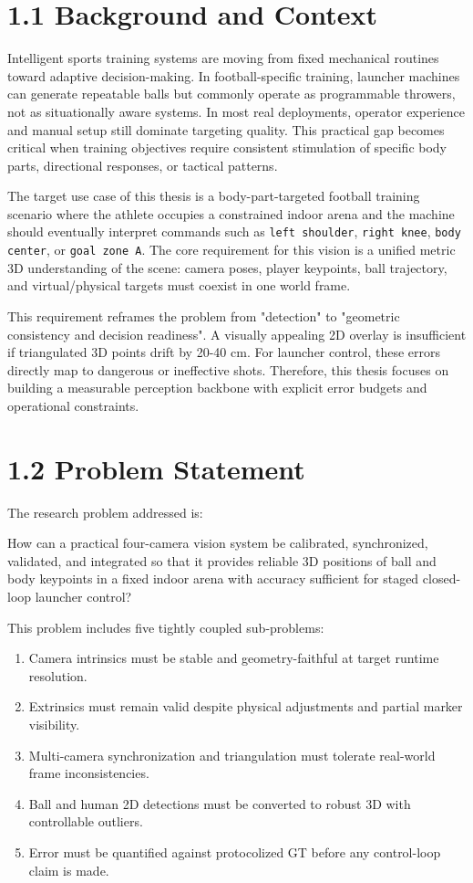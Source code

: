 \section{1.1 Background and Context}
Intelligent sports training systems are moving from fixed mechanical routines toward adaptive decision-making. In football-specific training, launcher machines can generate repeatable balls but commonly operate as programmable throwers, not as situationally aware systems. In most real deployments, operator experience and manual setup still dominate targeting quality. This practical gap becomes critical when training objectives require consistent stimulation of specific body parts, directional responses, or tactical patterns.

The target use case of this thesis is a body-part-targeted football training scenario where the athlete occupies a constrained indoor arena and the machine should eventually interpret commands such as \texttt{left shoulder}, \texttt{right knee}, \texttt{body center}, or \texttt{goal zone A}. The core requirement for this vision is a unified metric 3D understanding of the scene: camera poses, player keypoints, ball trajectory, and virtual/physical targets must coexist in one world frame.

This requirement reframes the problem from "detection" to "geometric consistency and decision readiness". A visually appealing 2D overlay is insufficient if triangulated 3D points drift by 20-40 cm. For launcher control, these errors directly map to dangerous or ineffective shots. Therefore, this thesis focuses on building a measurable perception backbone with explicit error budgets and operational constraints.

\section{1.2 Problem Statement}
The research problem addressed is:

How can a practical four-camera vision system be calibrated, synchronized, validated, and integrated so that it provides reliable 3D positions of ball and body keypoints in a fixed indoor arena with accuracy sufficient for staged closed-loop launcher control?

This problem includes five tightly coupled sub-problems:
\begin{enumerate}
  \item Camera intrinsics must be stable and geometry-faithful at target runtime resolution.
  \item Extrinsics must remain valid despite physical adjustments and partial marker visibility.
  \item Multi-camera synchronization and triangulation must tolerate real-world frame inconsistencies.
  \item Ball and human 2D detections must be converted to robust 3D with controllable outliers.
  \item Error must be quantified against protocolized GT before any control-loop claim is made.
\end{enumerate}

